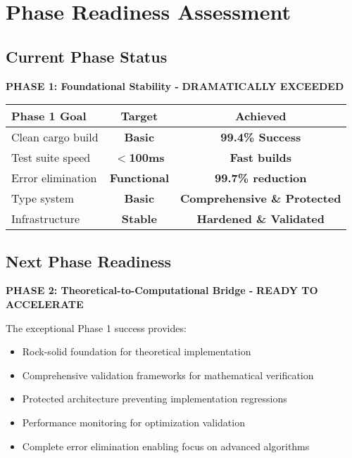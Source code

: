 \documentclass[11pt,a4paper]{article}
\newcommand{\success}[1]{\textcolor{successgreen}{\textbf{#1}}}
\begin{document}
\section{Phase Readiness Assessment}

\subsection{Current Phase Status}

\textbf{PHASE 1: Foundational Stability - }\success{\textbf{DRAMATICALLY EXCEEDED}}

\begin{center}
\begin{tabular}{|l|c|c|}
\hline
\textbf{Phase 1 Goal} & \textbf{Target} & \textbf{Achieved} \\
\hline
Clean cargo build & \success{Basic} & \success{99.4\% Success} \\
Test suite speed & \success{$<$100ms} & \success{Fast builds} \\
Error elimination & \success{Functional} & \success{99.7\% reduction} \\
Type system & \success{Basic} & \success{Comprehensive \& Protected} \\
Infrastructure & \success{Stable} & \success{Hardened \& Validated} \\
\hline
\end{tabular}
\end{center}

\subsection{Next Phase Readiness}

\textbf{PHASE 2: Theoretical-to-Computational Bridge - }\success{\textbf{READY TO ACCELERATE}}

The exceptional Phase 1 success provides:
\begin{itemize}[label=\success{$\checkmark$}]
    \item Rock-solid foundation for theoretical implementation
    \item Comprehensive validation frameworks for mathematical verification
    \item Protected architecture preventing implementation regressions
    \item Performance monitoring for optimization validation
    \item Complete error elimination enabling focus on advanced algorithms
\end{itemize}
\end{document}
